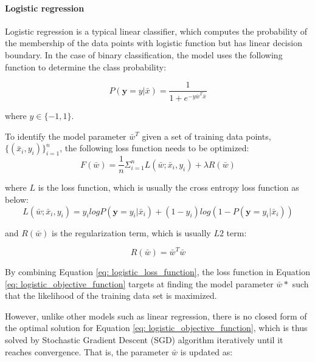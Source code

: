\paragraph{Logistic regression}
Logistic regression is a typical linear classifier, which computes the probability of the membership of the data points with logistic function but has linear decision boundary. In the case of binary classification, the model uses the following function to determine the class probability:

\begin{equation}\label{eq: logistic_regression_prob}
    P(\textbf{y}=y|\bar{x}) = \frac{1}{1+e^{-y\bar{w}^T\bar{x}}}
\end{equation}

where $y \in \{-1,1\}$.

To identify the model parameter $\bar{w}^T$ given a set of training data points, $\{(\bar{x}_i, y_i)\}_{i=1}^n$, the following loss function needs to be optimized:
\begin{equation}\label{eq: logistic_objective_function}
    F(\bar{w}) = \frac{1}{n}\Sigma_{i=1}^nL(\bar{w};\bar{x}_i, y_i) + \lambda R(\bar{w})
\end{equation}

where $L$ is the loss function, which is usually the cross entropy loss function as below:
\begin{equation}\label{eq: logistic_loss_function}
    L(\bar{w}; \bar{x}_i, y_i) = y_ilogP(\textbf{y}=y_i|\bar{x}_i) + (1-y_i)log(1-P(\textbf{y}=y_i|\bar{x}_i))
\end{equation}

and $R(\bar{w})$ is the regularization term, which is usually $L2$ term:

\begin{equation}
    R(\bar{w}) = \bar{w}^T\bar{w}
\end{equation}


By combining Equation \ref{eq: logistic_loss_function}, the loss function in Equation \ref{eq: logistic_objective_function} targets at finding the model parameter $\bar{w}*$ such that the likelihood of the training data set is maximized. 

However, unlike other models such as linear regression, there is no closed form of the optimal solution for Equation \ref{eq: logistic_objective_function}, which is thus solved by Stochastic Gradient Descent (SGD) algorithm \cite{robert2014machine} iteratively until it reaches convergence. That is, the parameter $\bar{w}$ is updated as:

